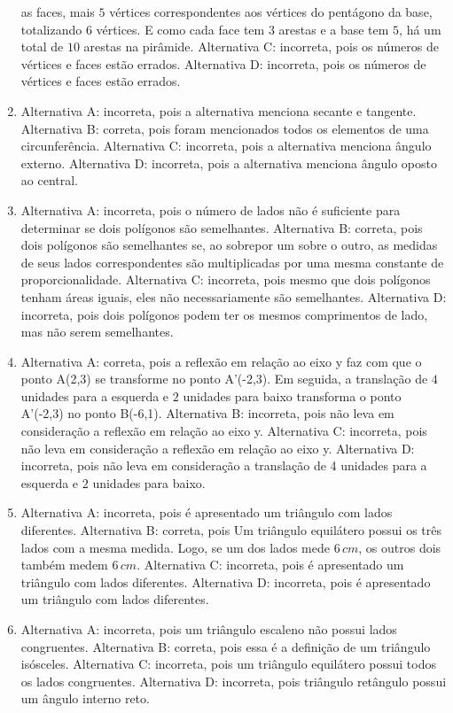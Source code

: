 \begin{enumerate}
as faces, mais $5$ vértices correspondentes aos vértices do pentágono da
base, totalizando $6$ vértices. E como cada face tem $3$ arestas e a base
tem $5$, há um total de $10$ arestas na pirâmide.
Alternativa C: incorreta, pois os números de vértices e faces estão
errados.
Alternativa D: incorreta, pois os números de vértices e faces estão
errados.
\item Alternativa A: incorreta, pois a alternativa menciona secante e
tangente.
Alternativa B: correta, pois foram mencionados todos os elementos de uma
circunferência.
Alternativa C: incorreta, pois a alternativa menciona ângulo externo.
Alternativa D: incorreta, pois a alternativa menciona ângulo oposto ao
central.
\item Alternativa A: incorreta, pois o número de lados não é suficiente para
determinar se dois polígonos são semelhantes.
Alternativa B: correta, pois dois polígonos são semelhantes se, ao
sobrepor um sobre o outro, as medidas de seus lados correspondentes são
multiplicadas por uma mesma constante de proporcionalidade.
Alternativa C: incorreta, pois mesmo que dois polígonos tenham áreas
iguais, eles não necessariamente são semelhantes.
Alternativa D: incorreta, pois dois polígonos podem ter os mesmos
comprimentos de lado, mas não serem semelhantes.
\item Alternativa A: correta, pois a reflexão em relação ao eixo y faz com que
o ponto A(2,3) se transforme no ponto A'(-2,3). Em seguida, a translação
de $4$ unidades para a esquerda e $2$ unidades para baixo transforma o ponto
A'(-2,3) no ponto B(-6,1).
Alternativa B: incorreta, pois não leva em consideração a reflexão em
relação ao eixo y.
Alternativa C: incorreta, pois não leva em consideração a reflexão em
relação ao eixo y.
Alternativa D: incorreta, pois não leva em consideração a translação de
4 unidades para a esquerda e $2$ unidades para baixo.
\item Alternativa A: incorreta, pois é apresentado um triângulo com lados
diferentes.
Alternativa B: correta, pois Um triângulo equilátero possui os três
lados com a mesma medida. Logo, se um dos lados mede $6\,cm$, os outros dois
também medem $6\,cm$.
Alternativa C: incorreta, pois é apresentado um triângulo com lados
diferentes.
Alternativa D: incorreta, pois é apresentado um triângulo com lados
diferentes.
\item Alternativa A: incorreta, pois um triângulo escaleno não possui lados
congruentes.
Alternativa B: correta, pois essa é a definição de um triângulo
isósceles.
Alternativa C: incorreta, pois um triângulo equilátero possui todos os
lados congruentes.
Alternativa D: incorreta, pois triângulo retângulo possui um ângulo
interno reto.
\end{enumerate}

